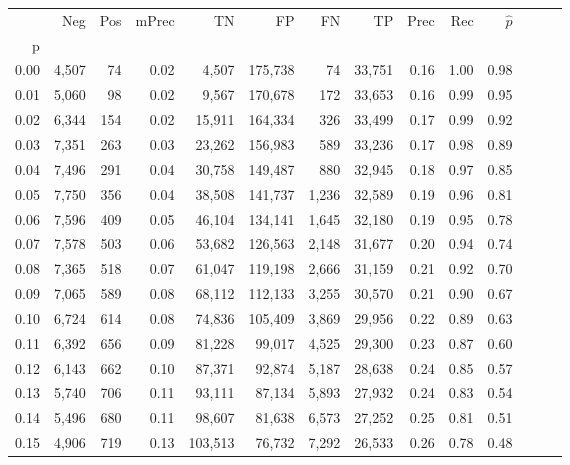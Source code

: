 \begin{tabular}{rrrrrrrrrrrrrr}
\toprule
{} &    Neg &  Pos & mPrec &       TN &       FP &      FN &      TP &  Prec &   Rec & $\hat{p}$ \\
p    &        &      &       &          &          &         &         &       &       &           \\
\midrule
0.00 &  4,507 &   74 &  0.02 &    4,507 &  175,738 &      74 &  33,751 &  0.16 &  1.00 &      0.98 \\
0.01 &  5,060 &   98 &  0.02 &    9,567 &  170,678 &     172 &  33,653 &  0.16 &  0.99 &      0.95 \\
0.02 &  6,344 &  154 &  0.02 &   15,911 &  164,334 &     326 &  33,499 &  0.17 &  0.99 &      0.92 \\
0.03 &  7,351 &  263 &  0.03 &   23,262 &  156,983 &     589 &  33,236 &  0.17 &  0.98 &      0.89 \\
0.04 &  7,496 &  291 &  0.04 &   30,758 &  149,487 &     880 &  32,945 &  0.18 &  0.97 &      0.85 \\
0.05 &  7,750 &  356 &  0.04 &   38,508 &  141,737 &   1,236 &  32,589 &  0.19 &  0.96 &      0.81 \\
0.06 &  7,596 &  409 &  0.05 &   46,104 &  134,141 &   1,645 &  32,180 &  0.19 &  0.95 &      0.78 \\
0.07 &  7,578 &  503 &  0.06 &   53,682 &  126,563 &   2,148 &  31,677 &  0.20 &  0.94 &      0.74 \\
0.08 &  7,365 &  518 &  0.07 &   61,047 &  119,198 &   2,666 &  31,159 &  0.21 &  0.92 &      0.70 \\
0.09 &  7,065 &  589 &  0.08 &   68,112 &  112,133 &   3,255 &  30,570 &  0.21 &  0.90 &      0.67 \\
0.10 &  6,724 &  614 &  0.08 &   74,836 &  105,409 &   3,869 &  29,956 &  0.22 &  0.89 &      0.63 \\
0.11 &  6,392 &  656 &  0.09 &   81,228 &   99,017 &   4,525 &  29,300 &  0.23 &  0.87 &      0.60 \\
0.12 &  6,143 &  662 &  0.10 &   87,371 &   92,874 &   5,187 &  28,638 &  0.24 &  0.85 &      0.57 \\
0.13 &  5,740 &  706 &  0.11 &   93,111 &   87,134 &   5,893 &  27,932 &  0.24 &  0.83 &      0.54 \\
0.14 &  5,496 &  680 &  0.11 &   98,607 &   81,638 &   6,573 &  27,252 &  0.25 &  0.81 &      0.51 \\
0.15 &  4,906 &  719 &  0.13 &  103,513 &   76,732 &   7,292 &  26,533 &  0.26 &  0.78 &      0.48 \\

\end{tabular}
